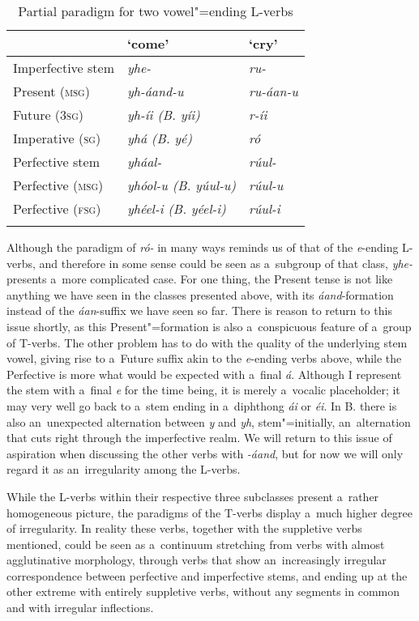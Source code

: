 \begin{table}[ht]
\caption{Partial paradigm for two vowel"=ending L-verbs}
\begin{tabularx}{\textwidth}{ Q Q Q }
\lsptoprule
&
`come' &
`cry'\\\hline
Imperfective stem &
\textit{yhe-} &
\textit{ru-} \\
Present (\textsc{msg}) &
\textit{yh-áand-u} &
\textit{ru-áan-u} \\
Future (\textsc{3sg}) &
\textit{yh-íi (B. yíi)} &
\textit{r-íi} \\
Imperative (\textsc{sg}) &
\textit{yhá (B. yé)} &
\textit{ró} \\
Perfective stem &
\textit{yháal-} &
\textit{rúul-} \\
Perfective (\textsc{msg}) &
\textit{yhóol-u (B. yúul-u)} &
\textit{rúul-u} \\
Perfective (\textsc{fsg}) &
\textit{yhéel-i (B. yéel-i)} &
\textit{rúul-i} \\\lspbottomrule
\end{tabularx}
\label{tab:8-7}
\end{table}


Although the paradigm of \textit{ró- }in many ways reminds us of that of the \textit{e}-ending L-verbs, and therefore in some sense could be seen as a~subgroup of that class, \textit{yhe-} presents a~more complicated case. For one thing, the Present tense is not like anything we have seen in the classes presented above, with its \textit{áand}-formation instead of the \textit{áan}-suffix we have seen so far. There is reason to return to this issue shortly, as this Present"=formation is also a~conspicuous feature of a~group of T-verbs. The other problem has to do with the quality of the underlying stem vowel, giving rise to a~Future suffix akin to the \textit{e}-ending verbs above, while the Perfective is more what would be expected with a~final \textit{á}. Although I represent the stem with a~final \textit{e} for the time being, it is merely a~vocalic placeholder; it may very well go back to a~stem ending in a~diphthong \textit{ái} or \textit{éi}. In B. there is also an~unexpected alternation between \textit{y} and \textit{yh}, stem"=initially, an~alternation that cuts right through the imperfective realm. We will return to this issue of aspiration when discussing the other verbs with \textit{-áand}, but for now we will only regard it as an~irregularity among the L-verbs.


While the L-verbs within their respective three subclasses present a~rather homogeneous picture, the paradigms of the T-verbs display a~much higher degree of irregularity. In reality these verbs, together with the suppletive verbs mentioned, could be seen as a~continuum stretching from verbs with almost agglutinative morphology, through verbs that show an~increasingly irregular correspondence between perfective and imperfective stems, and ending up at the other extreme with entirely suppletive verbs, without any segments in common and with irregular inflections. 


